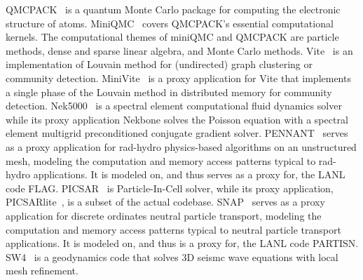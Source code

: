 %
QMCPACK~\cite{qmcpack} is a quantum Monte Carlo package for computing the electronic structure of atoms. MiniQMC~\cite{richards2018fy18} 
covers QMCPACK's essential computational kernels. The computational themes of miniQMC and QMCPACK are particle methods, dense and sparse linear algebra, and Monte Carlo methods.
%
Vite~\cite{Vite} is an implementation of Louvain method for (undirected)
graph clustering or community detection.  
MiniVite~\cite{miniVite} is a proxy application for Vite that implements a
single phase of the Louvain method in distributed memory for community
detection. 
%
Nek5000~\cite{Nek5000} is a spectral element computational fluid dynamics
solver while its proxy application Nekbone solves the Poisson equation with
a spectral element multigrid preconditioned conjugate gradient solver.  
%
PENNANT~\cite{pennant} serves as a proxy application for rad-hydro physics-based algorithms on an unstructured mesh, modeling the computation and memory access patterns typical to rad-hydro applications. It is modeled on, and thus serves as a proxy for, the LANL code FLAG.
%
PICSAR~\cite{PICSAR} is Particle-In-Cell solver, while its proxy
application, PICSARlite~\cite{picsarlite}, is a subset of the actual codebase.  
%
SNAP~\cite{snap} serves as a proxy application for discrete ordinates neutral particle transport, modeling the computation and memory access patterns typical to neutral particle transport applications. It is modeled on, and thus is a proxy for, the LANL code PARTISN.
%
SW4~\cite{SW42} is a geodynamics code that solves 3D seismc wave equations with local mesh refinement.
